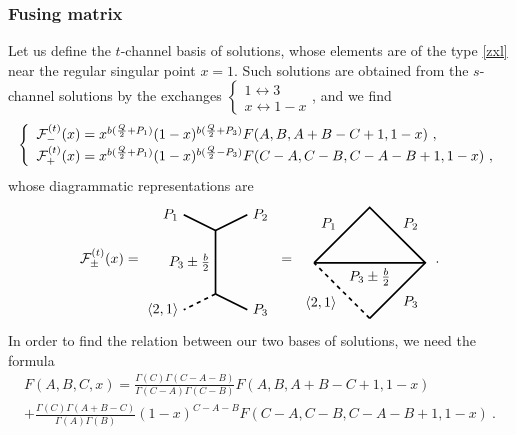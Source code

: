 \documentclass[12pt, a4paper, notitlepage, twoside]{report}
\numberwithin{equation}{section}
\theoremstyle{break}
\begin{document}
\subsubsection{Fusing matrix}

Let us define the $t$-channel basis of solutions, whose elements are of the type \eqref{zxl} near the regular singular point $x=1$.
Such solutions are obtained from the $s$-channel solutions by the exchanges $\left\{\begin{smallmatrix} 1\leftrightarrow 3\\ x\leftrightarrow 1-x \end{smallmatrix}\right.$, and we find 
\begin{align}
\renewcommand{\arraystretch}{1.3}
 \left\{\begin{array}{l}  \mathcal{F}^{(t)}_-(x) = x^{b(\frac{Q}{2}+P_1)} (1-x)^{b(\frac{Q}{2}+P_3)} F(A,B,A+B-C+1,1-x) \ ,
\\ \mathcal{F}^{(t)}_+(x) =x^{b(\frac{Q}{2}+P_1)} (1-x)^{b(\frac{Q}{2}-P_3)} F(C-A,C-B,C-A-B+1,1-x)\ ,
\end{array}\right. 
\label{tpm}
\end{align}
whose diagrammatic representations are 
\begin{align}
 \mathcal{F}^{(t)}_\pm(x)  =  
 \begin{tikzpicture}[baseline=(current  bounding  box.center), very thick, scale = .4]
 \draw (-2,3) node [left] {$P_1$} -- (0,2) -- node [left] {$P_3\pm \frac{b}{2}$} (0,-2);
 \draw[dashed] (0, -2) -- (-2, -3) node [left] {$\langle 2,1 \rangle$};
\draw (0,2) -- (2,3) node [right] {$P_2$};
\draw (0,-2) -- (2, -3) node [right] {$P_3$};
\end{tikzpicture}
\ =\
\begin{tikzpicture}[baseline=(current  bounding  box.center), very thick, scale = .7]
\draw (-2, 0) -- node [above left] {$P_1$} (0, 2) -- node [above right] {$P_2$} (2, 0) -- node [below right] {$P_3$} (0, -2);
\draw[dashed] (0, -2) -- node [below left] {$\langle 2,1 \rangle$} (-2, 0);
\draw (-2, 0) -- node [below] {$P_3\pm \frac{b}{2}$} (2, 0); 
\end{tikzpicture}
\ \ .
\label{tpic}
\end{align}
In order to find the relation between our two bases of solutions, we need the formula
\begin{multline}
 F(A,B,C,x) = \frac{\Gamma(C)\Gamma(C-A-B)}{\Gamma(C-A)\Gamma(C-B)} F(A,B,A+B-C+1,1-x) 
\\
 + \frac{\Gamma(C)\Gamma(A+B-C)}{\Gamma(A)\Gamma(B)} (1-x)^{C-A-B}F(C-A,C-B,C-A-B+1,1-x)\ .
\end{multline}
\end{document}
